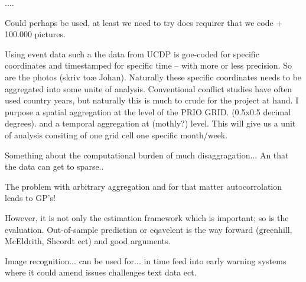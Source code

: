 \documentclass[a4paper]{article}
\begin{document}
....

Could perhaps be used, at least we need to try does requirer that we code + 100.000 pictures.

Using event data such a the data from UCDP is goe-coded for specific coordinates and timestamped for specific time -- with more or less precision. So are the photos (skriv toæ Johan). Naturally these specific coordinates needs to be aggregated into some unite of analysis. Conventional conflict studies have often used country years, but naturally this is much to crude for the project at hand. I purpose a spatial aggregation at the level of the PRIO GRID. (0.5x0.5 decimal degrees). and a temporal aggregation at (mothly?) level. This will give us a unit of analysis consiting of one grid cell one specific month/week. 

Something about the computational burden of much disaggragation... An that the data can get to sparse..

The problem with arbitrary aggregation and for that matter autocorrolation leads to GP's!


However, it is not only the estimation framework which is important; so is the evaluation. Out-of-sample prediction or eqavelent is the way forward (greenhill, McEldrith, Shcordt ect) and good arguments.







Image recognition... can be used for... in time feed into early warning systems where it could amend issues challenges text data ect.


\end{document}
